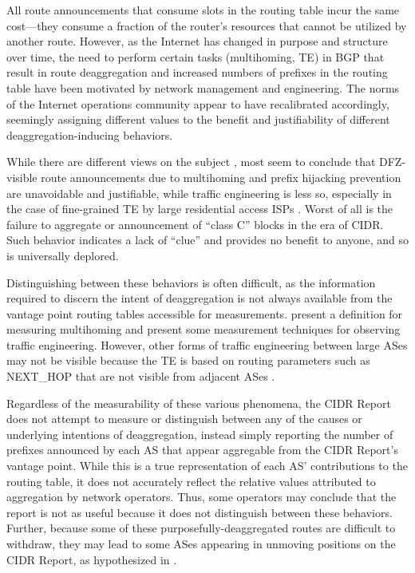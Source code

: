 All route announcements that consume slots in the routing table incur the same
cost---they consume a fraction of the router's resources that cannot be
utilized by another route. However, as the Internet has changed in purpose and
structure over time, the need to perform certain tasks (multihoming, TE) in BGP
that result in route deaggregation and increased numbers of prefixes in the
routing table have been motivated by network management and engineering. The
norms of the Internet operations community appear to have recalibrated
accordingly, seemingly assigning different values to the benefit and
justifiability of different deaggregation-inducing behaviors.

While there are different views on the subject \cite{Li:2011vn}, most seem to
conclude that DFZ-visible route announcements due to multihoming and prefix
hijacking prevention are unavoidable and justifiable, while traffic engineering
is less so, especially in the case of fine-grained TE by large residential
access ISPs \cite{Steenbergen:2010nx}. Worst of all is the failure to aggregate
or announcement of ``class C'' blocks in the era of CIDR. Such behavior
indicates a lack of ``clue'' and provides no benefit to anyone, and so is
universally deplored.

Distinguishing between these behaviors is often difficult, as the information
required to discern the intent of deaggregation is not always available from
the vantage point routing tables accessible for measurements. \cite{Bu:2004fk}
present a definition for measuring multihoming and \cite{Cittadini:2010pi}
present some measurement techniques for observing traffic engineering. However,
other forms of traffic engineering between large ASes may not be visible
because the TE is based on routing parameters such as NEXT\_HOP that are not
visible from adjacent ASes \cite{Steenbergen:2010nx}.

Regardless of the measurability of these various phenomena, the CIDR Report
does not attempt to measure or distinguish between any of the causes or
underlying intentions of deaggregation, instead simply reporting the number of
prefixes announced by each AS that appear aggregable from the CIDR Report's
vantage point. While this is a true representation of each AS' contributions to
the routing table, it does not accurately reflect the relative values
attributed to aggregation by network operators. Thus, some operators may
conclude that the report is not as useful because it does not distinguish
between these behaviors. Further, because some of these
purposefully-deaggregated routes are difficult to withdraw, they may lead to
some ASes appearing in unmoving positions on the CIDR Report, as hypothesized
in \cite{Steenbergen:2010nx}.

